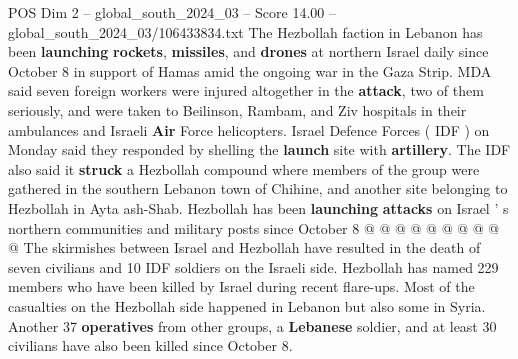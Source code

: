 \begin{textsample}{POS Dim 2 – global\_south\_2024\_03 – Score 14.00 – global\_south\_2024\_03/106433834.txt}
The Hezbollah faction in Lebanon has been \textbf{launching} \textbf{rockets}, \textbf{missiles}, and \textbf{drones} at northern Israel daily since October 8 in support of Hamas amid the ongoing war in the Gaza Strip.
MDA said seven foreign workers were injured altogether in the \textbf{attack}, two of them seriously, and were taken to Beilinson, Rambam, and Ziv hospitals in their ambulances and Israeli \textbf{Air} Force helicopters.
Israel Defence Forces ( IDF ) on Monday said they responded by shelling the \textbf{launch} site with \textbf{artillery}.
The IDF also said it \textbf{struck} a Hezbollah compound where members of the group were gathered in the southern Lebanon town of Chihine, and another site belonging to Hezbollah in Ayta ash-Shab.
Hezbollah has been \textbf{launching} \textbf{attacks} on Israel ' s northern communities and military posts since October 8 @ @ @ @ @ @ @ @ @ @ The skirmishes between Israel and Hezbollah have resulted in the death of seven civilians and 10 IDF soldiers on the Israeli side.
Hezbollah has named 229 members who have been killed by Israel during recent flare-ups.
Most of the casualties on the Hezbollah side happened in Lebanon but also some in Syria.
Another 37 \textbf{operatives} from other groups, a \textbf{Lebanese} soldier, and at least 30 civilians have also been killed since October 8.

\end{textsample}
